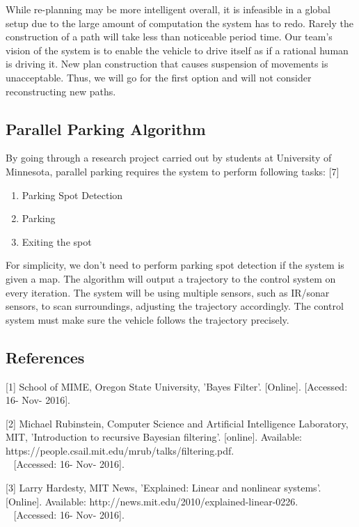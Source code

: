 \documentclass[compsoc,draftclsnofoot,onecolumn,10pt]{IEEEtran}
\begin{document}
While re-planning may be more intelligent overall, it is infeasible in a global 
setup due to the large amount of computation the system has to redo. Rarely the 
construction of a path will take less than noticeable period time. Our team's 
vision of the system is to enable the vehicle to drive itself as if a rational 
human is driving it. New plan construction that causes suspension of movements is 
unacceptable. Thus, we will go for the first option and will not consider 
reconstructing new paths.\par

\subsection{Parallel Parking Algorithm}
By going through a research project carried out by students at University of 
Minnesota, parallel parking requires the system to perform following tasks: [7]\par

\begin{enumerate}
\item Parking Spot Detection
\item Parking
\item Exiting the spot
\end{enumerate}

For simplicity, we don't need to perform parking spot detection if the system 
is given a map. The algorithm will output a trajectory to the control system on 
every iteration. The system will be using multiple sensors, such as IR/sonar 
sensors, to scan surroundings, adjusting the trajectory accordingly. The control 
system must make sure the vehicle follows the trajectory precisely.\par

\subsection{References}
[1] School of MIME, Oregon State University, 'Bayes Filter'. [Online].
[Accessed: 16- Nov- 2016].\par

[2] Michael Rubinstein, Computer Science and Artificial Intelligence Laboratory, 
MIT, 'Introduction to recursive Bayesian filtering'. [online]. 
Available: https://people.csail.mit.edu/mrub/talks/filtering.pdf.\\~
[Accessed: 16- Nov- 2016].\par  

[3] Larry Hardesty, MIT News, 'Explained: Linear and nonlinear systems'. [Online].
Available: http://news.mit.edu/2010/explained-linear-0226.\\~
[Accessed: 16- Nov- 2016].\par
\end{document}
